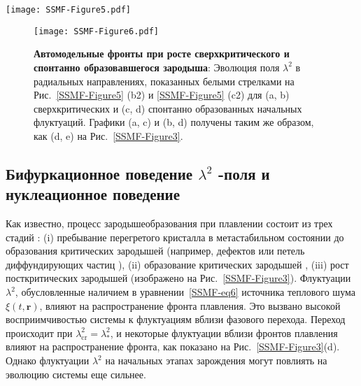 \begin{figure*}[!t]
\centering
\texttt{[image: SSMF-Figure5.pdf]}
 \caption{\textbf{Эволюция различных начальных $\lambda^2$-флуктуаций и спонтанное зародышеобразование в однородной системе}:
 Последовательность снимков эволюции (a) докритической и (b) сверхкритической начальной флуктуации $\lambda^2$ и (c) спонтанного зарождения из-за теплового шума.}
\label{SSMF-Figure5}
\end{figure*}

\begin{figure}[!t]
\centering
\texttt{[image: SSMF-Figure6.pdf]}
 \caption{\textbf{Автомодельные фронты при росте сверхкритического и спонтанно образовавшегося зародыша}:
 Эволюция поля $ \lambda^2$ в радиальных направлениях, показанных белыми стрелками на Рис.~\ref{SSMF-Figure5} (b2) и \ref{SSMF-Figure5} (c2) для (a, b) сверхкритических и (c, d) спонтанно образованных начальных флуктуаций.
  Графики (a, c) и (b, d) получены таким же образом, как (d, e) на Рис.~\ref{SSMF-Figure3}.}
\label{SSMF-Figure6}
\end{figure}

\subsection{Бифуркационное поведение $\lambda^2$ -поля и нуклеационное поведение}
\label{SSMF-Results-Modeling}

Как известно, процесс зародышеобразования при плавлении состоит из трех стадий \cite{10.1038/ncomms7942}: (i) пребывание перегретого кристалла в метастабильном состоянии до образования критических зародышей (например, дефектов \cite{10.1038/nmat1375} или петель диффундирующих частиц \cite{10.1103/physrevb.77.134109}), (ii) образование критических зародышей \cite{10.1126/science.1224763, 10.1063/1.2790424, 10.1063/1.2424715},  (iii) рост посткритических зародышей (изображено на Рис.~\ref{SSMF-Figure3}).
Флуктуации $\lambda^2$, обусловленные наличием в уравнении~\eqref{SSMF-eq6} источника теплового шума $\xi(t, \mathbf{r})$, влияют на распространение фронта плавления. Это вызвано высокой восприимчивостью системы к флуктуациям вблизи фазового перехода.
Переход происходит при $\lambda_{\mathrm{cr}}^2=\lambda_\ast^2$,
и некоторые флуктуации вблизи фронтов плавления влияют на распространение фронта, как показано на Рис.~\ref{SSMF-Figure3}(d).
Однако флуктуации $\lambda^2$ на начальных этапах зарождения могут повлиять на эволюцию системы еще сильнее.

